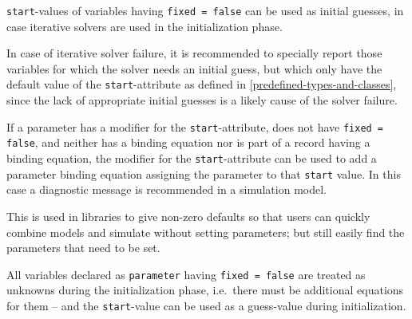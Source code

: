 \lstinline!start!-values of variables having \lstinline!fixed = false! can be used as initial guesses, in case iterative solvers are used in the initialization phase.

\begin{nonnormative}
In case of iterative solver failure, it is recommended to specially report those variables for which the solver needs an initial guess, but which only have the default value of the \lstinline!start!-attribute as defined in \cref{predefined-types-and-classes}, since the lack of appropriate initial guesses is a likely cause of the solver failure.
\end{nonnormative}

If a parameter has a modifier for the \lstinline!start!-attribute, does not have \lstinline!fixed = false!, and neither has a binding equation nor is part of a record having a binding equation, the modifier for the \lstinline!start!-attribute can be used to add a parameter binding equation assigning the parameter to that \lstinline!start! value.
In this case a diagnostic message is recommended in a simulation model.

\begin{nonnormative}
This is used in libraries to give non-zero defaults so that users can quickly combine models and simulate without setting parameters; but still easily find the parameters that need to be set.
\end{nonnormative}

All variables declared as \lstinline!parameter! having \lstinline!fixed = false! are treated as unknowns during the initialization phase, i.e.\ there must be additional equations for them -- and the \lstinline!start!-value can be used as a guess-value during initialization.

